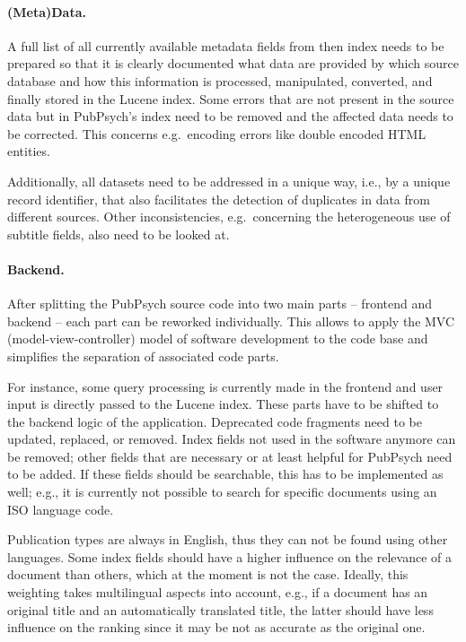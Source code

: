 \documentclass[a4paper,11pt]{article}
\begin{document}
\paragraph{(Meta)Data.}
A full list of all currently available metadata fields from then index needs to be prepared so that it is clearly documented what data are provided by which source database and how this information is processed, manipulated, converted, and finally stored in the Lucene index. Some errors that are not present in the source data but in PubPsych's index need to be removed and the affected data needs to be corrected. This concerns e.g.\ encoding errors like double encoded HTML entities.

Additionally, all datasets need to be addressed in a unique way, i.e., by a unique record identifier, that also facilitates the detection of duplicates in data from different sources. Other inconsistencies, e.g.\ concerning the heterogeneous use of subtitle fields, also need to be looked at.

\paragraph{Backend.}
After splitting the PubPsych source code into two main parts -- frontend and backend -- each part can be reworked individually. This allows to apply the MVC (model-view-controller) model of software development to the code base and simplifies the separation of associated code parts.

For instance, some query processing is currently made in the frontend and user input is directly passed to the Lucene index. These parts have to be shifted to the backend logic of the application. Deprecated code fragments need to be updated, replaced, or removed. Index fields not used in the software anymore can be removed; other fields that are necessary or at least helpful for PubPsych need to be added. If these fields should be searchable, this has to be implemented as well; e.g., it is currently not possible to search for specific documents using an ISO language code. 

Publication types are always in English, thus they can not be found using other languages. Some index fields should have a higher influence on the relevance of a document than others, which at the moment is not the case. Ideally, this weighting takes multilingual aspects into account, e.g., if a document has an original title and an automatically translated title, the latter should have less influence on the ranking since it may be not as accurate as the original one.
\end{document}
